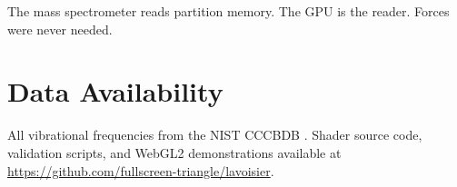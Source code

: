 \documentclass[11pt,twocolumn,a4paper]{article}
\theoremstyle{definition}
\theoremstyle{remark}
\begin{document}
The mass spectrometer reads partition memory. The GPU is the reader. Forces were never needed.

\section*{Data Availability}

All vibrational frequencies from the NIST CCCBDB \citep{johnson2022}. Shader source code, validation scripts, and WebGL2 demonstrations available at \url{https://github.com/fullscreen-triangle/lavoisier}.



\end{document}
